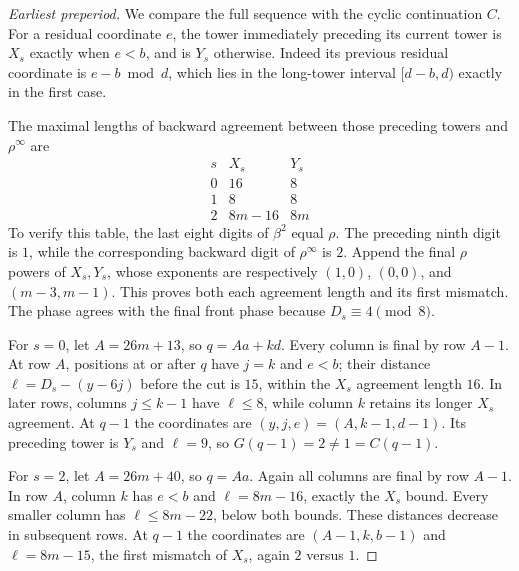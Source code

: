 \documentclass[11pt]{article}
\theoremstyle{remark}\newtheorem{remark}[theorem]{Remark}
\begin{document}
\begin{proof}[Earliest preperiod]
We compare the full sequence with the cyclic continuation $C$.
For a residual coordinate $e$, the tower immediately preceding its
current tower is $X_s$ exactly when $e<b$, and is $Y_s$ otherwise.
Indeed its previous residual coordinate is $e-b\bmod d$, which lies
in the long-tower interval $[d-b,d)$ exactly in the first case.

The maximal lengths of backward agreement between those preceding
towers and $\rho^\infty$ are
\begin{equation}\label{eq:upper-suffix-lengths}
\begin{array}{c|cc}
s&X_s&Y_s\\\hline
0&16&8\\
1&8&8\\
2&8m-16&8m
\end{array}
\end{equation}
To verify this table, the last eight digits of $\beta^2$ equal $\rho$.
The preceding ninth digit is $1$, while the corresponding backward
digit of $\rho^\infty$ is $2$.  Append the final $\rho$ powers of
$X_s,Y_s$, whose exponents are respectively $(1,0)$, $(0,0)$, and
$(m-3,m-1)$.  This proves both each agreement length and its first
mismatch.  The phase agrees with the final front phase because
$D_s\equiv4\pmod8$.

For $s=0$, let $A=26m+13$, so $q=Aa+kd$.  Every column is final by
row $A-1$.  At row $A$, positions at or after $q$ have $j=k$ and $e<b$;
their distance $\ell=D_s-(y-6j)$ before the cut is $15$, within the
$X_s$ agreement length $16$.  In later rows, columns $j\le k-1$ have
$\ell\le8$, while column $k$ retains its longer $X_s$ agreement.
At $q-1$ the coordinates are $(y,j,e)=(A,k-1,d-1)$.  Its preceding
tower is $Y_s$ and $\ell=9$, so $G(q-1)=2\ne1=C(q-1)$.

For $s=2$, let $A=26m+40$, so $q=Aa$.  Again all columns are final
by row $A-1$.  In row $A$, column $k$ has $e<b$ and
$\ell=8m-16$, exactly the $X_s$ bound.  Every smaller column has
$\ell\le8m-22$, below both bounds.  These distances decrease in
subsequent rows.  At $q-1$ the coordinates are $(A-1,k,b-1)$ and
$\ell=8m-15$, the first mismatch of $X_s$, again $2$ versus $1$.


\end{proof}
\end{document}
